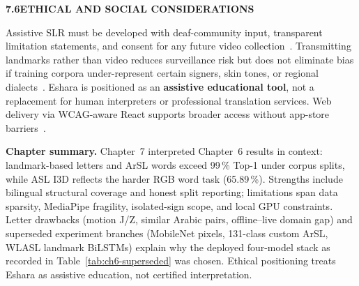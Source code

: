\clearpage
\noindent\textbf{7.6\quad ETHICAL AND SOCIAL CONSIDERATIONS}\par
{}
\vspace{0.2cm}

\noindent Assistive SLR must be developed with deaf-community input, transparent limitation statements, and consent for any future video collection~\cite{who2024hearing}. Transmitting landmarks rather than video reduces surveillance risk but does not eliminate bias if training corpora under-represent certain signers, skin tones, or regional dialects~\cite{johnson2019signer,wcag22}. Eshara is positioned as an \textbf{assistive educational tool}, not a replacement for human interpreters or professional translation services. Web delivery via WCAG-aware React supports broader access without app-store barriers~\cite{wcag22}.\par\vspace{0.2cm}

\noindent\textbf{Chapter summary.} Chapter~7 interpreted Chapter~6 results in context: landmark-based letters and ArSL words exceed 99\,\% Top-1 under corpus splits, while ASL I3D reflects the harder RGB word task (65.89\,\%). Strengths include bilingual structural coverage and honest split reporting; limitations span data sparsity, MediaPipe fragility, isolated-sign scope, and local GPU constraints. Letter drawbacks (motion J/Z, similar Arabic pairs, offline--live domain gap) and superseded experiment branches (MobileNet pixels, 131-class custom ArSL, WLASL landmark BiLSTMs) explain why the deployed four-model stack as recorded in Table~\ref{tab:ch6-superseded} was chosen. Ethical positioning treats Eshara as assistive education, not certified interpretation.\par
